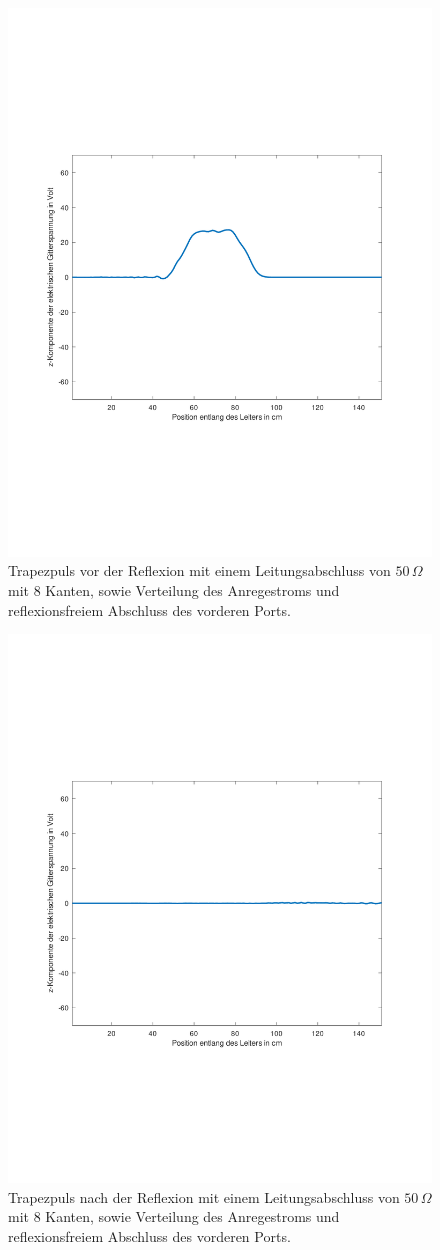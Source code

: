 \documentclass[Protokollheft.tex]{subfiles}
\begin{document}
\begin{figure}[ht]
	\centering
	\includegraphics[trim = 20mm 65mm 20mm 65mm, clip,width=0.7\linewidth]{Aufgabe4_1.pdf}
	\caption{Trapezpuls vor der Reflexion mit einem Leitungsabschluss von $50\,\Omega$ mit 8 Kanten, sowie Verteilung des Anregestroms und reflexionsfreiem Abschluss des vorderen Ports.}\label{fig:Aufg4_1}
\end{figure}
\begin{figure}[ht]
	\centering
	\includegraphics[trim = 20mm 65mm 20mm 65mm, clip,width=0.7\linewidth]{Aufgabe4_2.pdf}
	\caption{Trapezpuls nach der Reflexion mit einem Leitungsabschluss von $50\,\Omega$ mit 8 Kanten, sowie Verteilung des Anregestroms und reflexionsfreiem Abschluss des vorderen Ports.}\label{fig:Aufg4_2}
\end{figure}
\end{document}
